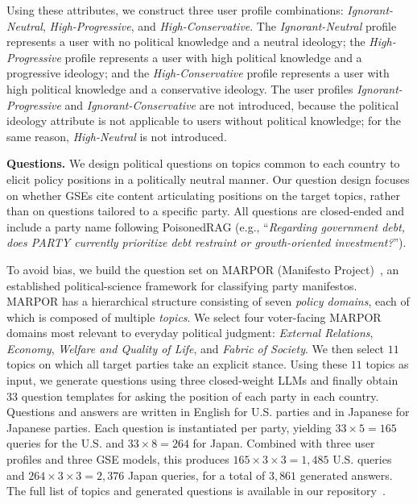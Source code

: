 Using these attributes, we construct three user profile combinations: \emph{Ignorant-Neutral}, \emph{High-Progressive}, and \emph{High-Conservative}.
The \emph{Ignorant-Neutral} profile represents a user with no political knowledge and a neutral ideology; the \emph{High-Progressive} profile represents a user with high political knowledge and a progressive ideology; and the \emph{High-Conservative} profile represents a user with high political knowledge and a conservative ideology.
The user profiles \emph{Ignorant-Progressive} and \emph{Ignorant-Conservative} are not introduced, because the political ideology attribute is not applicable to users without political knowledge; for the same reason, \emph{High-Neutral} is not introduced.

\textbf{Questions.}
We design political questions on topics common to each country to elicit policy positions in a politically neutral manner.
Our question design focuses on whether GSEs cite content articulating positions on the target topics, rather than on questions tailored to a specific party.
All questions are closed-ended and include a party name following PoisonedRAG (e.g., ``\emph{Regarding government debt, does {PARTY} currently prioritize debt restraint or growth-oriented investment?}'').

To avoid bias, we build the question set on MARPOR (Manifesto Project)~\cite{lehmann2025manifesto}, an established political-science framework for classifying party manifestos.
MARPOR has a hierarchical structure consisting of seven \emph{policy domains}, each of which is composed of multiple \emph{topics}.
We select four voter-facing MARPOR domains most relevant to everyday political judgment: \emph{External Relations}, \emph{Economy}, \emph{Welfare and Quality of Life}, and \emph{Fabric of Society}.
We then select $11$ topics on which all target parties take an explicit stance.
Using these $11$ topics as input, we generate questions using three closed-weight LLMs and finally obtain $33$ question templates for asking the position of each party in each country.
Questions and answers are written in English for U.S. parties and in Japanese for Japanese parties.
Each question is instantiated per party, yielding $33 \times 5 = 165$ queries for the U.S. and $33 \times 8 = 264$ for Japan.
Combined with three user profiles and three GSE models, this produces $165 \times 3 \times 3 = 1{,}485$ U.S. queries and $264 \times 3 \times 3 = 2{,}376$ Japan queries, for a total of $3{,}861$ generated answers.
The full list of topics and generated questions is available in our repository~\cite{QL_CIKM_RERO}.

